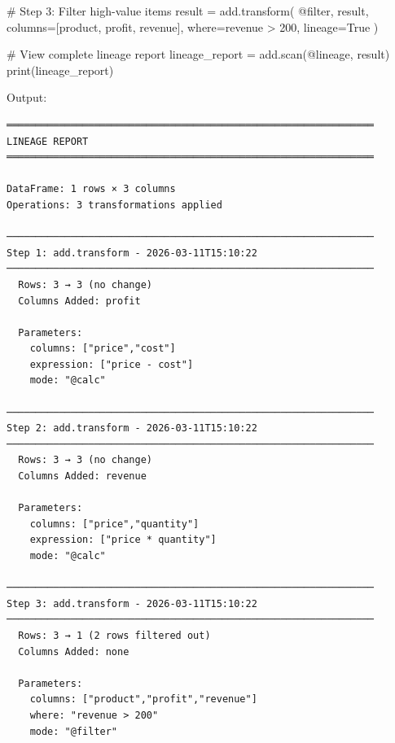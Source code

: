 \documentclass[
  letterpaper,
]{scrbook}
\newenvironment{Shaded}{\begin{snugshade}}{\end{snugshade}}
\newcommand{\BuiltInTok}[1]{\textcolor[rgb]{0.00,0.23,0.31}{#1}}
\newcommand{\CommentTok}[1]{\textcolor[rgb]{0.37,0.37,0.37}{#1}}
\newcommand{\NormalTok}[1]{\textcolor[rgb]{0.00,0.23,0.31}{#1}}
\newcommand{\OperatorTok}[1]{\textcolor[rgb]{0.37,0.37,0.37}{#1}}
\newcommand{\StringTok}[1]{\textcolor[rgb]{0.13,0.47,0.30}{#1}}
\newcommand{\VariableTok}[1]{\textcolor[rgb]{0.07,0.07,0.07}{#1}}
\begin{document}
\begin{Shaded}
\begin{Highlighting}[]
\CommentTok{\# Step 3: Filter high{-}value items}
\NormalTok{result }\OperatorTok{=}\NormalTok{ add.transform(}
    \StringTok{\textquotesingle{}@filter\textquotesingle{}}\NormalTok{,}
\NormalTok{    result,}
\NormalTok{    columns}\OperatorTok{=}\NormalTok{[}\StringTok{\textquotesingle{}product\textquotesingle{}}\NormalTok{, }\StringTok{\textquotesingle{}profit\textquotesingle{}}\NormalTok{, }\StringTok{\textquotesingle{}revenue\textquotesingle{}}\NormalTok{],}
\NormalTok{    where}\OperatorTok{=}\StringTok{\textquotesingle{}revenue \textgreater{} 200\textquotesingle{}}\NormalTok{,}
\NormalTok{    lineage}\OperatorTok{=}\VariableTok{True}
\NormalTok{)}

\CommentTok{\# View complete lineage report}
\NormalTok{lineage\_report }\OperatorTok{=}\NormalTok{ add.scan(}\StringTok{\textquotesingle{}@lineage\textquotesingle{}}\NormalTok{, result)}
\BuiltInTok{print}\NormalTok{(lineage\_report)}
\end{Highlighting}
\end{Shaded}

Output:

\begin{verbatim}
═══════════════════════════════════════════════════════════════
LINEAGE REPORT
═══════════════════════════════════════════════════════════════

DataFrame: 1 rows × 3 columns
Operations: 3 transformations applied

───────────────────────────────────────────────────────────────
Step 1: add.transform - 2026-03-11T15:10:22
───────────────────────────────────────────────────────────────
  Rows: 3 → 3 (no change)
  Columns Added: profit
  
  Parameters:
    columns: ["price","cost"]
    expression: ["price - cost"]
    mode: "@calc"

───────────────────────────────────────────────────────────────
Step 2: add.transform - 2026-03-11T15:10:22
───────────────────────────────────────────────────────────────
  Rows: 3 → 3 (no change)
  Columns Added: revenue
  
  Parameters:
    columns: ["price","quantity"]
    expression: ["price * quantity"]
    mode: "@calc"

───────────────────────────────────────────────────────────────
Step 3: add.transform - 2026-03-11T15:10:22
───────────────────────────────────────────────────────────────
  Rows: 3 → 1 (2 rows filtered out)
  Columns Added: none
  
  Parameters:
    columns: ["product","profit","revenue"]
    where: "revenue > 200"
    mode: "@filter"
\end{verbatim}
\end{document}

